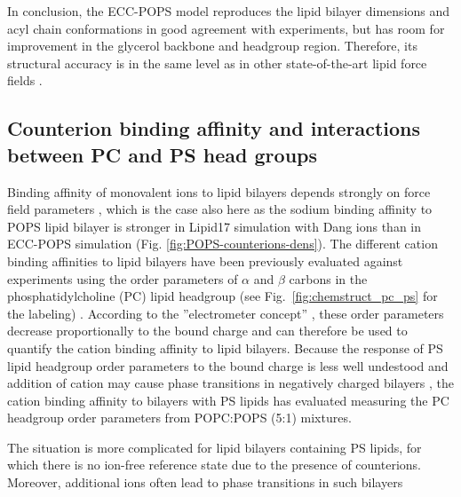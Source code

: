 \documentclass[journal=jpcbfk,manuscript=article]{achemso}
\begin{document}

In conclusion, the ECC-POPS model reproduces the lipid bilayer dimensions and
acyl chain conformations in good agreement with experiments, but has room for
improvement in the glycerol backbone and headgroup region. Therefore,
its structural accuracy is in the same level as in other state-of-the-art
lipid force fields \cite{botan15, ollila16, Pluhackova2016, nmrlipids_proj4}.
 
 
\subsection{Counterion binding affinity and interactions between PC and PS head groups}

Binding affinity of monovalent ions to lipid bilayers depends strongly on
force field parameters \cite{catte16,melcr18,nmrlipids_proj4},
which is the case also here as the sodium binding affinity to
POPS lipid bilayer is stronger in Lipid17 simulation with Dang ions than in
ECC-POPS simulation (Fig. \ref{fig:POPS-counterions-dens}).
The different cation binding affinities to lipid bilayers have been previously evaluated
against experiments using the order parameters of $\alpha$ and $\beta$ carbons in the
phosphatidylcholine (PC) lipid headgroup (see Fig.~\ref{fig:chemstruct_pc_ps} for the labeling) \cite{catte16,melcr18,nmrlipids_proj4}.
According to the ''electrometer concept'' \citep{seelig87}, these order parameters decrease
proportionally to the bound charge and can therefore be used to quantify the cation binding
affinity to lipid bilayers. Because the response of PS lipid headgroup order parameters to the bound charge
is less well undestood and addition of cation may cause phase transitions in negatively charged
bilayers \cite{feigenson86,mattai89,roux91,roux90}, the cation binding affinity to bilayers with
PS lipids has evaluated measuring the PC headgroup order parameters from POPC:POPS (5:1)
mixtures\cite{roux90,nmrlipids_proj4}.


The situation is more complicated for lipid bilayers containing
PS lipids, for which there is no ion-free reference state due to the presence of counterions.
Moreover, additional ions often lead to phase transitions in such bilayers \cite{nmrlipids_proj4,feigenson86,mattai89,roux91,roux90}
\end{document}

